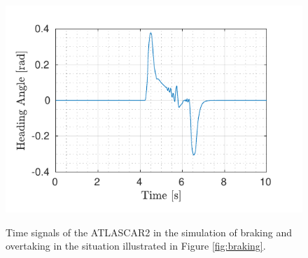 \begin{figure}[!h]
\begin{minipage}[t]{0.5\textwidth}
		\subcaption{}\label{fig:delta_braking}
	\end{minipage}
	\begin{minipage}[t]{0.5\textwidth}
		\includegraphics[width=\textwidth]{./figure/three_obstacles_no_overtaking/HeadingAngleVsTime.pdf}
		\subcaption{}\label{fig:theta_braking}
	\end{minipage}
	\caption{Time signals of the ATLASCAR2 in the simulation of braking and overtaking in the situation illustrated in Figure \ref{fig:braking}.}
	\label{fig:components}
\end{figure}
